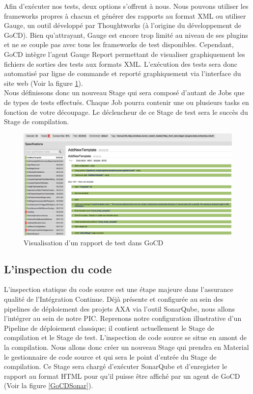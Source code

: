       Afin d'exécuter nos tests, deux options s'offrent à nous. Nous pouvons utiliser les frameworks propres à chacun et générer des rapports au format XML ou utiliser Gauge, un outil développé par Thoughtworks (à l'origine du développement de GoCD). Bien qu'attrayant, Gauge est encore trop limité au niveau de ses plugins et ne se couple pas avec tous les frameworks de test disponibles. Cependant, GoCD intègre l'agent Gauge Report permettant de visualiser graphiquement les fichiers de sorties des tests aux formats XML. L'exécution des tests sera donc automatisé par ligne de commande et reporté graphiquement via l'interface du site web (Voir la figure \ref{GoCDReportTest}).\\

      Nous définissons donc un nouveau Stage qui sera composé d'autant de Jobs que de types de tests effectués. Chaque Job pourra contenir une ou plusieurs tasks en fonction de votre découpage. Le déclencheur de ce Stage de test sera le succès du Stage de compilation.

      \begin{figure}
        \begin{center}
          \includegraphics[scale=0.15]{images/GoCDReportTest.png}
        \end{center}
        \caption{Visualisation d'un rapport de test dans GoCD}
        \label{GoCDReportTest}
      \end{figure}

      \subsection{L'inspection du code}
      L'inspection statique du code source est une étape majeure dans l'assurance qualité de l'Intégration Continue. Déjà présente et configurée au sein des pipelines de déploiement des projets AXA via l'outil SonarQube, nous allons l'intégrer au sein de notre PIC. Reprenons notre configuration illustrative d'un Pipeline de déploiement classique; il contient actuellement le Stage de compilation et le Stage de test. L'inspection de code source se situe en amont de la compilation. Nous allons donc créer un nouveau Stage qui prendra en Material le gestionnaire de code source et qui sera le point d'entrée du Stage de compilation. Ce Stage sera chargé d'exécuter SonarQube et d'enregister le rapport au format HTML pour qu'il puisse être affiché par un agent de GoCD (Voir la figure \ref{GoCDSonar}).\\

